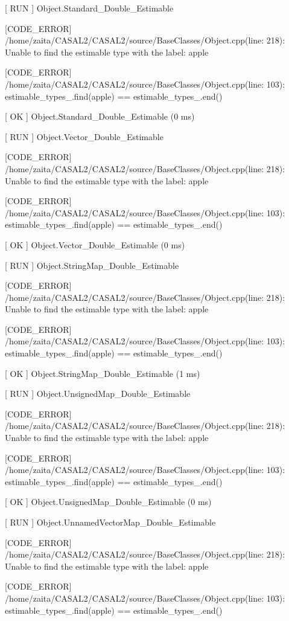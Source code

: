 \documentclass[a4paper,11pt,twoside,pdftex,draft]{article}
\begin{document}
{[} RUN {]} Object.Standard\_Double\_Estimable

{[}CODE\_ERROR{]}
/home/zaita/CASAL2/CASAL2/source/BaseClasses/Object.cpp(line: 218):
Unable to find the estimable type with the label: apple

{[}CODE\_ERROR{]}
/home/zaita/CASAL2/CASAL2/source/BaseClasses/Object.cpp(line: 103):
estimable\_types\_.find(apple) == estimable\_types\_.end()

{[} OK {]} Object.Standard\_Double\_Estimable (0 ms)

{[} RUN {]} Object.Vector\_Double\_Estimable

{[}CODE\_ERROR{]}
/home/zaita/CASAL2/CASAL2/source/BaseClasses/Object.cpp(line: 218):
Unable to find the estimable type with the label: apple

{[}CODE\_ERROR{]}
/home/zaita/CASAL2/CASAL2/source/BaseClasses/Object.cpp(line: 103):
estimable\_types\_.find(apple) == estimable\_types\_.end()

{[} OK {]} Object.Vector\_Double\_Estimable (0 ms)

{[} RUN {]} Object.StringMap\_Double\_Estimable

{[}CODE\_ERROR{]}
/home/zaita/CASAL2/CASAL2/source/BaseClasses/Object.cpp(line: 218):
Unable to find the estimable type with the label: apple

{[}CODE\_ERROR{]}
/home/zaita/CASAL2/CASAL2/source/BaseClasses/Object.cpp(line: 103):
estimable\_types\_.find(apple) == estimable\_types\_.end()

{[} OK {]} Object.StringMap\_Double\_Estimable (1 ms)

{[} RUN {]} Object.UnsignedMap\_Double\_Estimable

{[}CODE\_ERROR{]}
/home/zaita/CASAL2/CASAL2/source/BaseClasses/Object.cpp(line: 218):
Unable to find the estimable type with the label: apple

{[}CODE\_ERROR{]}
/home/zaita/CASAL2/CASAL2/source/BaseClasses/Object.cpp(line: 103):
estimable\_types\_.find(apple) == estimable\_types\_.end()

{[} OK {]} Object.UnsignedMap\_Double\_Estimable (0 ms)

{[} RUN {]} Object.UnnamedVectorMap\_Double\_Estimable

{[}CODE\_ERROR{]}
/home/zaita/CASAL2/CASAL2/source/BaseClasses/Object.cpp(line: 218):
Unable to find the estimable type with the label: apple

{[}CODE\_ERROR{]}
/home/zaita/CASAL2/CASAL2/source/BaseClasses/Object.cpp(line: 103):
estimable\_types\_.find(apple) == estimable\_types\_.end()
\end{document}
